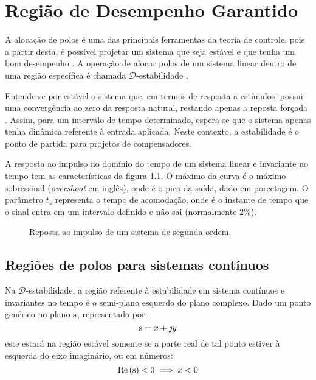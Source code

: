 \chapter{Região de Desempenho Garantido}

A alocação de polos é uma das principais ferramentas da teoria de controle, pois a partir desta, é possível projetar um sistema que seja estável e que tenha um bom desempenho . A operação de alocar polos de um sistema linear dentro de uma região específica é chamada $\mathscr{D}$-estabilidade .

Entende-se por estável o sistema que, em termos de resposta a estímulos, possui uma convergência ao zero da resposta natural, restando apenas a reposta forçada \cite{NISE2011}. Assim, para um intervalo de tempo determinado, espera-se que o sistema apenas tenha dinâmica referente à entrada aplicada. Neste contexto, a estabilidade é o ponto de partida para projetos de compensadores.

A resposta ao impulso no domínio do tempo de um sistema linear e invariante no tempo tem as características da figura \ref{fig:ImpulseResponse}. O máximo da curva é o máximo sobressinal (\emph{overshoot} em inglês), onde é o pico da saída, dado em porcetagem. O parâmetro $t_s$ representa o tempo de acomodação, onde é o instante de tempo que o sinal entra em um intervalo definido e não sai (normalmente 2\%).

\begin{figure}[!ht]
  \centering
  
  \caption{Reposta ao impulso de um sistema de segunda ordem.}
  \label{fig:ImpulseResponse}
\end{figure}

\section{Regiões de polos para sistemas contínuos}\label{sec:DEstabilidadeS}

Na $\mathscr{D}$-estabilidade, a região referente à estabilidade em sistema contínuos e invariantes no tempo é o semi-plano esquerdo do plano complexo. Dado um ponto genérico no plano $\operatorname{\mathrm{s}}$, representado por:
\begin{equation}
  \operatorname{\mathrm{s}} = x + \jmath y\label{eq:PontoGenericoPlanoS}
\end{equation}
este estará na região estável somente se a parte real de tal ponto estiver à esquerda do eixo imaginário, ou em números:
\begin{equation}
  \operatorname{Re}{(\operatorname{\mathrm{s}})} < 0 \implies x < 0 \label{eq:Estabilidade}
\end{equation}

